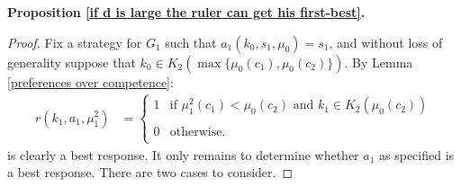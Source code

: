 \documentclass[11pt,]{article}
\begin{document}
\noindent\textbf{Proposition \ref{if d is large the ruler can get his first-best}.}
\begin{proof}Fix a strategy for $G_1$ such that $a_1(k_0,s_1,\mu_0)=s_1$, and without loss of generality suppose that $k_0\in K_2(\max\{\mu_0(c_1),\mu_0(c_2)\})$.  By Lemma \ref{preferences over competence}:
\begin{align*}
r(k_1,a_1,\mu_1^2)&=\left\{\begin{array}{ll}
1&\mbox{if }\mu_1^2(c_1)<\mu_0(c_2)\mbox{ and }k_1\in K_2(\mu_0(c_2))\\
&\\
0&\mbox{otherwise}.\\
\end{array}\right.
\end{align*}is clearly a best response.  It only remains to determine whether $a_1$ as specified is a best response.  There are two cases to consider.


\end{proof}
\end{document}
